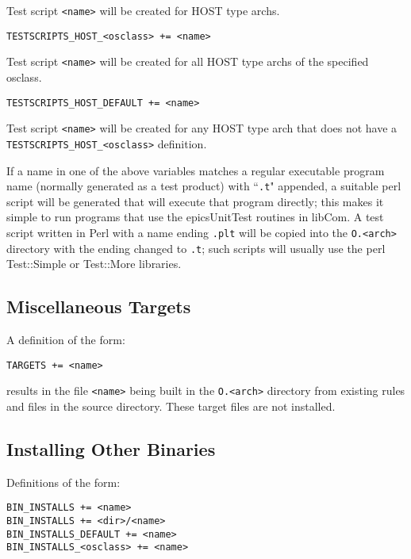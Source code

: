 \begin{description}
Test script \verb|<name>| will be created for HOST type archs.

\item \verb|TESTSCRIPTS_HOST_<osclass> += <name>|

Test script \verb|<name>| will be created for all HOST type archs of the specified osclass.

\item \verb|TESTSCRIPTS_HOST_DEFAULT += <name>|

Test script \verb|<name>| will be created for any HOST type arch that does not have a \\
\verb|TESTSCRIPTS_HOST_<osclass>| definition.

\end{description}

If a name in one of the above variables matches a regular executable program name (normally generated as a test product) 
with ``\verb|.t|" appended, a suitable perl script will be generated that will execute that program directly; this makes it simple to 
run programs that use the epicsUnitTest routines in libCom.  A test script written in Perl with a name ending \verb|.plt| will be 
copied into the \verb|O.<arch>| directory with the ending changed to \verb|.t|; such scripts will usually use the perl Test::Simple or 
Test::More libraries.

\subsection{Miscellaneous Targets}

A definition of the form:

\begin{verbatim}
TARGETS += <name>
\end{verbatim}

results in the file \verb|<name>| being built in the \verb|O.<arch>| directory from existing rules and files in the source directory. These 
target files are not installed.

\subsection{Installing Other Binaries}

Definitions of the form:

\begin{verbatim}
BIN_INSTALLS += <name>
BIN_INSTALLS += <dir>/<name>
BIN_INSTALLS_DEFAULT += <name>
BIN_INSTALLS_<osclass> += <name>
\end{verbatim}

